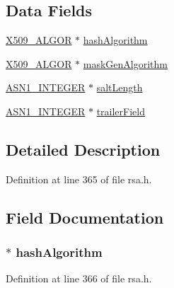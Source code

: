 \subsection*{Data Fields}
\begin{DoxyCompactItemize}
\item 
\hyperlink{crypto_2ossl__typ_8h_aa2b6185e6254f36f709cd6577fb5022e}{X509\+\_\+\+A\+L\+G\+OR} $\ast$ \hyperlink{structrsa__pss__params__st_a8ce216d7fda96e3d0c13d36ba437b55a}{hash\+Algorithm}
\item 
\hyperlink{crypto_2ossl__typ_8h_aa2b6185e6254f36f709cd6577fb5022e}{X509\+\_\+\+A\+L\+G\+OR} $\ast$ \hyperlink{structrsa__pss__params__st_a2965bfd71458602306f15e308cfea1e6}{mask\+Gen\+Algorithm}
\item 
\hyperlink{crypto_2ossl__typ_8h_af4335399bf9774cb410a5e93de65998b}{A\+S\+N1\+\_\+\+I\+N\+T\+E\+G\+ER} $\ast$ \hyperlink{structrsa__pss__params__st_aef20ac0efef108bdf491165ced153ce8}{salt\+Length}
\item 
\hyperlink{crypto_2ossl__typ_8h_af4335399bf9774cb410a5e93de65998b}{A\+S\+N1\+\_\+\+I\+N\+T\+E\+G\+ER} $\ast$ \hyperlink{structrsa__pss__params__st_a4b4910dd91b98d46dcb40a29c54d4f29}{trailer\+Field}
\end{DoxyCompactItemize}


\subsection{Detailed Description}


Definition at line 365 of file rsa.\+h.



\subsection{Field Documentation}
\subsubsection[{\texorpdfstring{hash\+Algorithm}{hashAlgorithm}}]{ $\ast$ hash\+Algorithm}\hypertarget{structrsa__pss__params__st_a8ce216d7fda96e3d0c13d36ba437b55a}{}\label{structrsa__pss__params__st_a8ce216d7fda96e3d0c13d36ba437b55a}


Definition at line 366 of file rsa.\+h.

